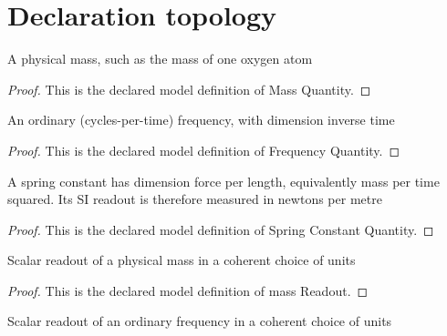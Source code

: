 \section{Declaration topology}
\begin{definition}
  \label{def:physics:phyx-mini-0207:phyxminiproblems-problemphyxmini0207-massquantity}
  A physical mass, such as the mass of one oxygen atom
\end{definition}
\begin{proof}
  This is the declared model definition of Mass Quantity.
\end{proof}
\begin{definition}
  \label{def:physics:phyx-mini-0207:phyxminiproblems-problemphyxmini0207-frequencyquantity}
  An ordinary (cycles-per-time) frequency, with dimension inverse time
\end{definition}
\begin{proof}
  This is the declared model definition of Frequency Quantity.
\end{proof}
\begin{definition}
  \label{def:physics:phyx-mini-0207:phyxminiproblems-problemphyxmini0207-springconstantquantity}
  A spring constant has dimension force per length, equivalently mass per time squared. Its SI readout is therefore measured in newtons per metre
\end{definition}
\begin{proof}
  This is the declared model definition of Spring Constant Quantity.
\end{proof}
\begin{definition}
  \label{def:physics:phyx-mini-0207:phyxminiproblems-problemphyxmini0207-massreadout}
  Scalar readout of a physical mass in a coherent choice of units
\end{definition}
\begin{proof}
  This is the declared model definition of mass Readout.
\end{proof}
\begin{definition}
  \label{def:physics:phyx-mini-0207:phyxminiproblems-problemphyxmini0207-frequencyreadout}
  Scalar readout of an ordinary frequency in a coherent choice of units
\end{definition}
